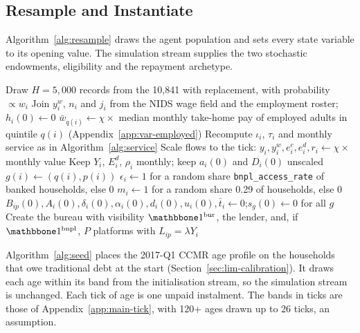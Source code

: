 \subsection{Resample and Instantiate}\label{app:init-resample}

Algorithm~\ref{alg:resample} draws the agent population and sets every state variable to its
opening value. The simulation stream supplies the two stochastic endowments, eligibility and the
repayment archetype.

\begin{algorithm}[!htbp]
\caption{Resample and instantiate}
\label{alg:resample}
\begin{algorithmic}
\State Draw $H = 5{,}000$ records from the 10{,}841 with replacement, with probability $\propto w_i$
    \State Join $y^w_i$, $n_i$ and $j_i$ from the \ac{NIDS} wage field and the employment roster;\quad $h_i(0) \gets 0$
    \State $\bar w_{q(i)} \gets \chi \times$ median monthly take-home pay of employed adults in quintile $q(i)$ (Appendix~\ref{app:var-employed})
    \State Recompute $\iota_i$, $\tau_i$ and monthly service as in Algorithm~\ref{alg:service}
    \State Scale flows to the tick: $y_i, y^w_i, e^c_i, e^d_i, r_i \gets \chi \times$ monthly value
    \State Keep $Y_i$, $E^d_i$, $\rho_i$ monthly; keep $a_i(0)$ and $D_i(0)$ unscaled
    \State $g(i) \gets (q(i), p(i))$
\EndFor
{}
\State $\epsilon_i \gets 1$ for a random share \texttt{bnpl\_access\_rate} of banked households, else 0
\State $m_i \gets 1$ for a random share 0.29 of households, else 0
\State $B_{ip}(0), A_i(0), \delta_i(0), \alpha_i(0), d_i(0), u_i(0), \bar t_i \gets 0$;\quad $s_g(0) \gets 0$ for all $g$
\State Create the bureau with visibility $\ind^{\text{bur}}$, the lender, and, if $\ind^{\text{bnpl}}$, $P$ platforms with $L_{ip} = \lambda Y_i$
\end{algorithmic}
\end{algorithm}

Algorithm~\ref{alg:seed} places the 2017-Q1 \ac{CCMR} age profile on the households that owe
traditional debt at the start (Section~\ref{sec:lim-calibration}). It draws each age within its
band from the initialisation stream, so the simulation stream is unchanged. Each tick of age is
one unpaid instalment. The bands in ticks are those of
Appendix~\ref{app:main-tick}, with 120+ ages drawn up to 26 ticks, an assumption.

